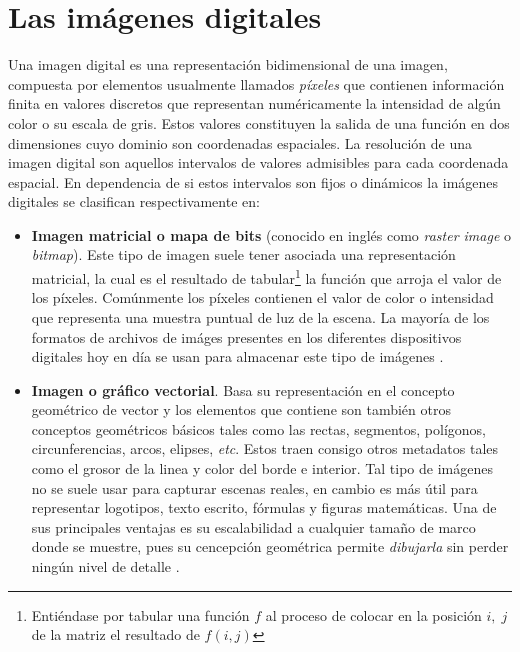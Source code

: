 \section{Las im\'agenes digitales}\label{sec:digital_images}
Una imagen digital \cite{solomon2011fundamentals,enwiki:di,eswiki:id} es una representaci\'on bidimensional de una imagen, compuesta por elementos usualmente llamados \textit{p\'ixeles} que contienen informaci\'on finita en valores discretos que representan num\'ericamente la intensidad de alg\'un color o su escala de gris. Estos valores constituyen la salida de una funci\'on en dos dimensiones cuyo dominio son coordenadas espaciales. La resolución de una imagen digital son aquellos intervalos de valores admisibles para cada coordenada espacial. En dependencia de si estos intervalos son fijos o din\'amicos la im\'agenes digitales se clasifican respectivamente en:
\begin{itemize}
	\item \textbf{Imagen matricial o mapa de bits} (conocido en ingl\'es como \textit{raster image} o \textit{bitmap}). Este tipo de imagen suele tener asociada una representaci\'on matricial, la cual es el resultado de tabular\footnote{Entiéndase por tabular una funci\'on $f$ al proceso de colocar en la posici\'on $i,\;j$ de la matriz el resultado de $f(i, j)$} la funci\'on que arroja el valor de los p\'ixeles. Comúnmente los píxeles contienen el valor de color o intensidad que representa una muestra puntual de luz de la escena. La mayor\'ia de los formatos de archivos de im\'ages presentes en los diferentes dispositivos digitales hoy en d\'ia se usan para almacenar este tipo de im\'agenes \cite{eswiki:imp}.
	\item \textbf{Imagen o gr\'afico vectorial}. Basa su representaci\'on en el concepto geom\'etrico de vector y los elementos que contiene son tambi\'en otros conceptos geom\'etricos b\'asicos tales como las rectas, segmentos, pol\'igonos, circunferencias, arcos, elipses, \textit{etc}. Estos traen consigo otros metadatos tales como el grosor de la linea y color del borde e interior. Tal tipo de im\'agenes no se suele usar para capturar escenas reales, en cambio es m\'as \'util para representar logotipos, texto escrito, f\'ormulas y figuras matem\'aticas. Una de sus principales ventajas es su escalabilidad a cualquier tamaño de marco donde se muestre, pues su cencepci\'on geom\'etrica permite \textit{dibujarla} sin perder ning\'un nivel de detalle \cite{eswiki:igv}.
\end{itemize}

